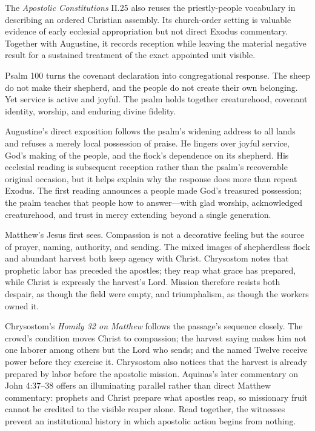 \begin{deepstudy}
The \emph{Apostolic Constitutions} II.25 also reuses the priestly-people vocabulary in describing an ordered Christian assembly. Its church-order setting is valuable evidence of early ecclesial appropriation but not direct Exodus commentary. Together with Augustine, it records reception while leaving the material negative result for a sustained treatment of the exact appointed unit visible.

Psalm 100 turns the covenant declaration into congregational response. The sheep do not make their shepherd, and the people do not create their own belonging. Yet service is active and joyful. The psalm holds together creaturehood, covenant identity, worship, and enduring divine fidelity.

Augustine's direct exposition follows the psalm's widening address to all lands and refuses a merely local possession of praise. He lingers over joyful service, God's making of the people, and the flock's dependence on its shepherd. His ecclesial reading is subsequent reception rather than the psalm's recoverable original occasion, but it helps explain why the response does more than repeat Exodus. The first reading announces a people made God's treasured possession; the psalm teaches that people how to answer---with glad worship, acknowledged creaturehood, and trust in mercy extending beyond a single generation.

Matthew's Jesus first sees. Compassion is not a decorative feeling but the source of prayer, naming, authority, and sending. The mixed images of shepherdless flock and abundant harvest both keep agency with Christ. Chrysostom notes that prophetic labor has preceded the apostles; they reap what grace has prepared, while Christ is expressly the harvest's Lord. Mission therefore resists both despair, as though the field were empty, and triumphalism, as though the workers owned it.

Chrysostom's \emph{Homily 32 on Matthew} follows the passage's sequence closely. The crowd's condition moves Christ to compassion; the harvest saying makes him not one laborer among others but the Lord who sends; and the named Twelve receive power before they exercise it. Chrysostom also notices that the harvest is already prepared by labor before the apostolic mission. Aquinas's later commentary on John 4:37--38 offers an illuminating parallel rather than direct Matthew commentary: prophets and Christ prepare what apostles reap, so missionary fruit cannot be credited to the visible reaper alone. Read together, the witnesses prevent an institutional history in which apostolic action begins from nothing.


\end{deepstudy}
